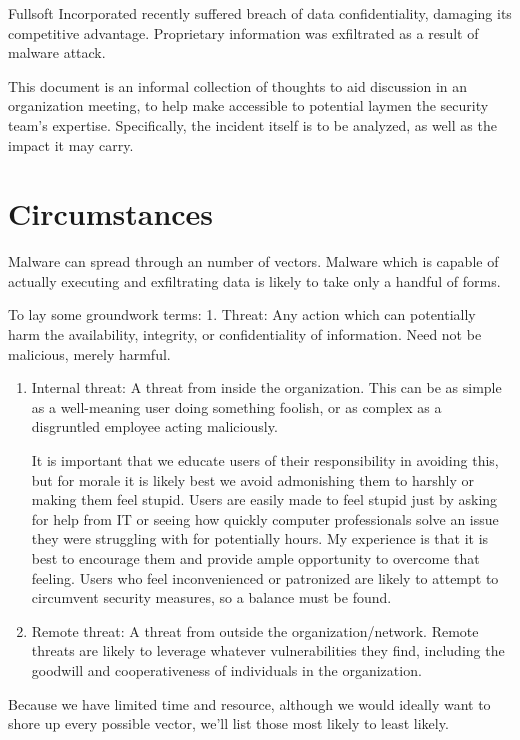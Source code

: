 Fullsoft Incorporated recently suffered breach of data confidentiality,
damaging its competitive advantage. Proprietary information was
exfiltrated as a result of malware attack.

This document is an informal collection of thoughts to aid discussion in
an organization meeting, to help make accessible to potential laymen the
security team's expertise. Specifically, the incident itself is to be
analyzed, as well as the impact it may carry.

\hypertarget{circumstances}{%
\section{Circumstances}\label{circumstances}}

Malware can spread through an number of vectors. Malware which is
capable of actually executing and exfiltrating data is likely to take
only a handful of forms.

To lay some groundwork terms: 1. Threat: Any action which can
potentially harm the availability, integrity, or confidentiality of
information. Need not be malicious, merely harmful.

\begin{enumerate}
\def\labelenumi{\arabic{enumi}.}
\setcounter{enumi}{1}
\item
  Internal threat: A threat from inside the organization. This can be as
  simple as a well-meaning user doing something foolish, or as complex
  as a disgruntled employee acting maliciously.

  It is important that we educate users of their responsibility in
  avoiding this, but for morale it is likely best we avoid admonishing
  them to harshly or making them feel stupid. Users are easily made to
  feel stupid just by asking for help from IT or seeing how quickly
  computer professionals solve an issue they were struggling with for
  potentially hours. My experience is that it is best to encourage them
  and provide ample opportunity to overcome that feeling. Users who feel
  inconvenienced or patronized are likely to attempt to circumvent
  security measures, so a balance must be found.
\item
  Remote threat: A threat from outside the organization/network. Remote
  threats are likely to leverage whatever vulnerabilities they find,
  including the goodwill and cooperativeness of individuals in the
  organization.
\end{enumerate}

Because we have limited time and resource, although we would ideally
want to shore up every possible vector, we'll list those most likely to
least likely.

